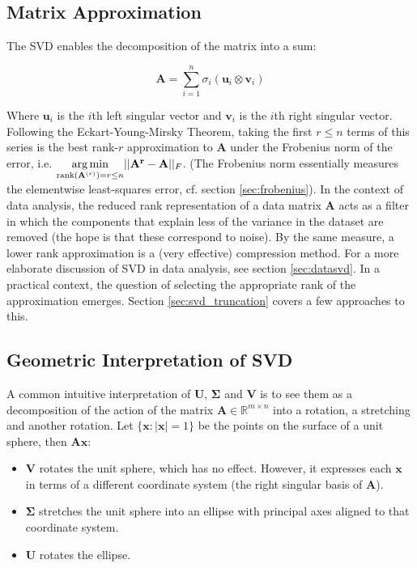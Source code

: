 \subsection{Matrix Approximation}
The SVD enables the decomposition of the matrix into a sum:

\begin{equation}
\mathbf{A} = \sum_{i=1}^n \sigma_i (\mathbf{u}_i \otimes \mathbf{v}_i)
\end{equation}

Where $\mathbf{u}_i$ is the $i$th left singular vector and $\mathbf{v}_i$ is the $i$th right singular vector. Following the Eckart-Young-Mirsky Theorem, taking the first $r \leq n$ terms of this series is the best rank-$r$ approximation to $\mathbf{A}$ under the Frobenius norm of the error, i.e.  $\underset{\mathrm{rank}(\mathbf{A}^{(r)})=r\leq n}{\operatorname*{arg\,min}} ||\mathbf{A^r}-\mathbf{A}||_F$. (The Frobenius norm essentially measures the elementwise least-squares error, cf. section \ref{sec:frobenius}). In the context of data analysis, the reduced rank representation of a data matrix $\mathbf{A}$ acts as a filter in which the components that explain less of the variance in the dataset are removed (the hope is that these correspond to noise). By the same measure, a lower rank approximation is a (very effective) compression method. For a more elaborate discussion of SVD in data analysis, see section \ref{sec:datasvd}. In a practical context, the question of selecting the appropriate rank of the approximation emerges. Section \ref{sec:svd_truncation} covers a few approaches to this.


\subsection{Geometric Interpretation of SVD}
A common intuitive interpretation of $\mathbf{U}$, $\mathbf{\Sigma}$ and $\mathbf{V}$ is to see them as a decomposition of the action of the matrix $\mathbf{A}\in\mathbb{R}^{m\times n}$ into a rotation, a stretching and another rotation. Let $\{\mathbf{x} : |\mathbf{x}|=1 \}$ be the points on the surface of a unit sphere, then $\mathbf{Ax}$:

\begin{itemize}
\item $\mathbf{V}$ rotates the unit sphere, which has no effect. However, it expresses each $\mathbf{x}$ in terms of a different coordinate system (the right singular basis of $\mathbf{A}$). 
\item $\mathbf{\Sigma}$ stretches the unit sphere into an ellipse with principal axes aligned to that coordinate system.
\item $\mathbf{U}$ rotates the ellipse.
\end{itemize}

